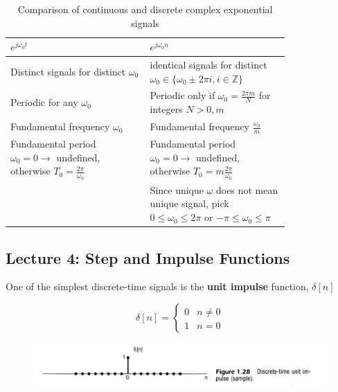 \documentclass[10pt]{article}
\begin{document}
\begin{table}[H]
	\centering
	\caption{Comparison of continuous and discrete complex exponential signals}
	\label{tab:label}
	\begin{tabular}{|p{0.4\linewidth}|p{0.4\linewidth}|}
		\hline
	 $ e^{j\omega_0t} $ & $ e^{j\omega_0n} $   \\ \hline
	 Distinct signals for distinct $\omega_{0} $ & identical signals for distinct $ \omega_0 \in \{\omega_0 \pm 2\pi i, i \in \mathbb{Z}\} $   \\ \hline
	 Periodic for any $ \omega_0 $ & Periodic only if $ \omega_0 = \frac{2\pi m}{N}  $ for integers $ N>0, m $  \\ \hline
	 Fundamental frequency  $ \omega_0 $ & Fundamental frequency $\frac{\omega_0}{m}$  \\ \hline
	 Fundamental period $ \omega_0 = 0 \rightarrow $ undefined, otherwise $ T_0 = \frac{2\pi}{\omega_0} $ & Fundamental period $ \omega_0 = 0 \rightarrow $ undefined, otherwise $ T_0 = m\frac{2\pi}{\omega_0} $  \\ \hline
																																																				& Since unique $ \omega $ does not mean unique signal, pick $ 0 \le \omega_0 \le 2\pi $ or $ -\pi \le \omega_0 \le  \pi$  \\
	 \hline
	\end{tabular}
\end{table}

\subsection{Lecture 4: Step and Impulse Functions}

One of the simplest discrete-time signals is the \textbf{unit impulse} function, $ \delta[n] $ 


\begin{definition}
\begin{equation}
	\delta[n] = \begin{cases}
		0 & n \neq 0 \\
		1 & n = 0
	\end{cases}
	\label{eq:355:unit_impulse}
\end{equation}


\begin{figure}[H]
	\centering
	\includegraphics[width=0.8\linewidth]{img/image_2022-09-16-14-12-45.png}
\end{figure}
\end{definition}
\end{document}
